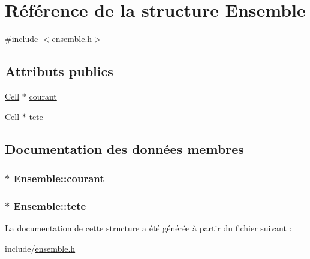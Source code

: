 \hypertarget{structEnsemble}{\section{\-Référence de la structure \-Ensemble}
\label{structEnsemble}
}


{\ttfamily \#include $<$ensemble.\-h$>$}

\subsection*{\-Attributs publics}
\begin{DoxyCompactItemize}
\item 
\hyperlink{structCell}{\-Cell} $\ast$ \hyperlink{structEnsemble_a2962c7ff3817d074d6ffeb75f3a764b1}{courant}
\item 
\hyperlink{structCell}{\-Cell} $\ast$ \hyperlink{structEnsemble_abb1d7f65429442d3b36beceede08ff71}{tete}
\end{DoxyCompactItemize}


\subsection{\-Documentation des données membres}
\hypertarget{structEnsemble_a2962c7ff3817d074d6ffeb75f3a764b1}{
\subsubsection[{courant}]{$\ast$ {\bf \-Ensemble\-::courant}}}\label{structEnsemble_a2962c7ff3817d074d6ffeb75f3a764b1}
\hypertarget{structEnsemble_abb1d7f65429442d3b36beceede08ff71}{
\subsubsection[{tete}]{$\ast$ {\bf \-Ensemble\-::tete}}}\label{structEnsemble_abb1d7f65429442d3b36beceede08ff71}


\-La documentation de cette structure a été générée à partir du fichier suivant \-:\begin{DoxyCompactItemize}
\item 
include/\hyperlink{ensemble_8h}{ensemble.\-h}\end{DoxyCompactItemize}
